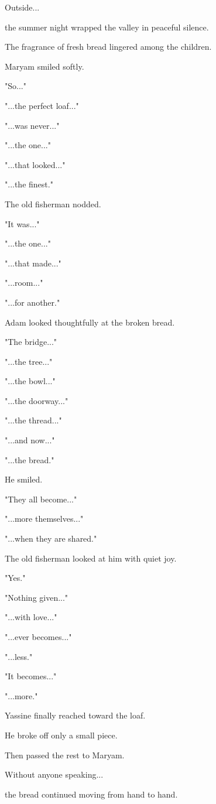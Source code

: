 \documentclass[12pt,openany]{book}
\begin{document}
Outside...

the summer night wrapped the valley in peaceful silence.

The fragrance of fresh bread lingered among the children.

Maryam smiled softly.

"So..."

"...the perfect loaf..."

"...was never..."

"...the one..."

"...that looked..."

"...the finest."

The old fisherman nodded.

"It was..."

"...the one..."

"...that made..."

"...room..."

"...for another."

Adam looked thoughtfully at the broken bread.

"The bridge..."

"...the tree..."

"...the bowl..."

"...the doorway..."

"...the thread..."

"...and now..."

"...the bread."

He smiled.

"They all become..."

"...more themselves..."

"...when they are shared."

The old fisherman looked at him with quiet joy.

"Yes."

"Nothing given..."

"...with love..."

"...ever becomes..."

"...less."

"It becomes..."

"...more."

Yassine finally reached toward the loaf.

He broke off only a small piece.

Then passed the rest to Maryam.

Without anyone speaking...

the bread continued moving from hand to hand.
\end{document}

